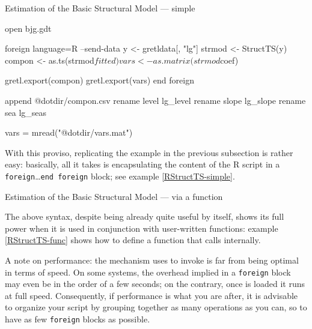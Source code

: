 \begin{script}[htbp]
  \caption{Estimation of the Basic Structural Model --- simple}
\begin{scode}
open bjg.gdt

foreign language=R --send-data
    y <- gretldata[, "lg"]
    strmod <- StructTS(y)
    compon <- as.ts(strmod$fitted)
    vars <- as.matrix(strmod$coef)
            
    gretl.export(compon)
    gretl.export(vars)
end foreign

append @dotdir/compon.csv
rename level lg_level
rename slope lg_slope
rename sea lg_seas

vars = mread("@dotdir/vars.mat")
\end{scode}
\label{RStructTS-simple}
\end{script}

With this proviso, replicating the example in the previous subsection
is rather easy: basically, all it takes is encapsulating the content
of the R script in a \texttt{foreign}\ldots\texttt{end foreign}
block; see example \ref{RStructTS-simple}.

\begin{script}[htbp]
  \caption{Estimation of the Basic Structural Model --- via a function}
  \label{RStructTS-func}
\end{script}

The above syntax, despite being already quite useful by itself, shows
its full power when it is used in conjunction with user-written
functions: example \ref{RStructTS-func} shows how to define a
 function that calls  internally.

A note on performance: the mechanism  uses to invoke
 is far from being optimal in terms of speed. On some systems,
the overhead implied in a \texttt{foreign} block may even be in the
order of a few seconds; on the contrary, once  is loaded it
runs at full speed. Consequently, if performance is what you are
after, it is advisable to organize your script by grouping together as
many  operations as you can, so to have as few \texttt{foreign}
blocks as possible.



